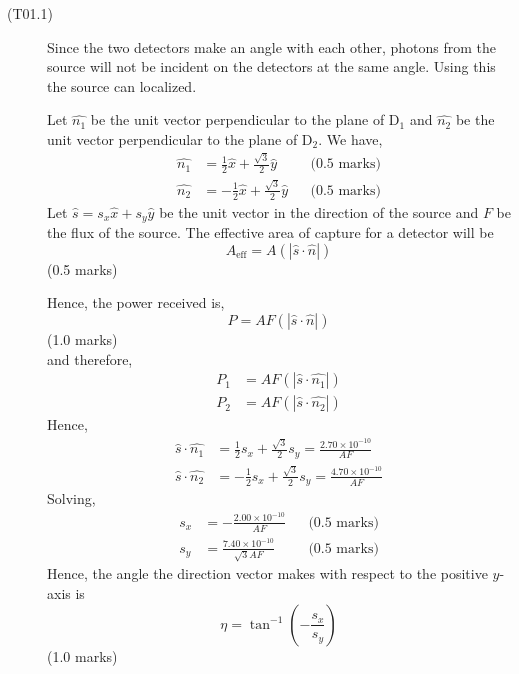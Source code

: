 \begin{description}
\item[(T01.1)]
Since the two detectors make an angle with each other, photons from the
source will not be incident on the detectors at the same angle. Using this
the source can localized.

Let $\widehat{n_1}$ be the unit vector perpendicular to the plane of
D$_1$ and $\widehat{n_2}$ be the unit vector perpendicular to the plane of
D$_2$. We have,
\begin{align*}
\widehat{n_1} &= \frac{1}{2}\widehat{x} + \frac{\sqrt{3}}{2}\widehat{y}
  && \text{(0.5 marks)} \\
\widehat{n_2} &= -\frac{1}{2}\widehat{x} + \frac{\sqrt{3}}{2}\widehat{y}
  && \text{(0.5 marks)}
\end{align*}
Let $\widehat{s} = s_x\widehat{x} + s_y\widehat{y}$ be the unit vector in
the direction of the source and $F$ be the flux of the source. The
effective area of capture for a detector will be
\[ A_{\mathrm{eff}} = A(|\widehat{s} \cdot \widehat{n}|) \]
\hfill(0.5 marks)

Hence, the power received is,
\[ P = AF(|\widehat{s} \cdot \widehat{n}|) \]
\hfill(1.0 marks)\\
and therefore,
\begin{align*}
P_1 &= AF(|\widehat{s} \cdot \widehat{n_1}|) \\
P_2 &= AF(|\widehat{s} \cdot \widehat{n_2}|)
\end{align*}
Hence,
\begin{align*}
\widehat{s} \cdot \widehat{n_1}
  &= \frac{1}{2}s_x + \frac{\sqrt{3}}{2}s_y
   = \frac{2.70 \times 10^{-10}}{AF} \\
\widehat{s} \cdot \widehat{n_2}
  &= -\frac{1}{2}s_x + \frac{\sqrt{3}}{2}s_y
   = \frac{4.70 \times 10^{-10}}{AF}
\end{align*}
Solving,
\begin{align*}
s_x &= -\frac{2.00 \times 10^{-10}}{AF}
  && \text{(0.5 marks)} \\
s_y &= \frac{7.40 \times 10^{-10}}{\sqrt{3}AF}
  && \text{(0.5 marks)}
\end{align*}
Hence, the angle the direction vector makes with respect to the positive
$y$-axis is
\[ \eta = \tan^{-1}\left(-\frac{s_x}{s_y}\right) \]
\hfill(1.0 marks)


\end{description}
